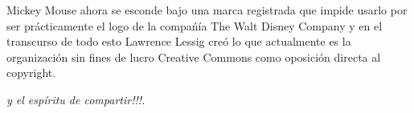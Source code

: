 \begin{multicols}{2}
Mickey Mouse ahora se esconde bajo una marca registrada que impide usarlo por ser prácticamente el logo de la compańía The Walt Disney Company y en el transcurso de todo esto Lawrence Lessig creó lo que actualmente es la organización sin fines de lucro Creative Commons como oposición directa al copyright.

\begin{entradilla} %
{\em {\color{introcolor}{Internet}} y el espíritu de compartir!!!.}
\end{entradilla}
\end{multicols}


\begin{center}
\end{center}

